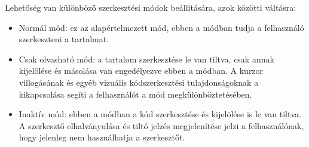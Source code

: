\documentclass{elteikthesis}
\begin{document}
				Lehetőség van különböző szerkesztési módok beállítására, azok közötti váltásra:
				\begin{itemize}
					\item Normál mód: ez az alapértelmezett mód, ebben a módban tudja a felhasználó szerkeszteni a tartalmat.
					\item Csak olvasható mód: a tartalom szerkesztése le van tiltva, csak annak kijelölése és másolása van engedélyezve ebben a módban. A kurzor villogásának és egyéb vizuális kódszerkesztési tulajdonságoknak a kikapcsolása segíti a felhasználót a mód megkülönböztetésében.
					\item Inaktív mód: ebben a módban a kód szerkesztése és kijelölése is le van tiltva. A szerkesztő elhalványulása és tiltó jelzés megjelenítése jelzi a felhasználónak, hogy jelenleg nem használhatja a szerkesztőt.
				\end{itemize}
\end{document}
